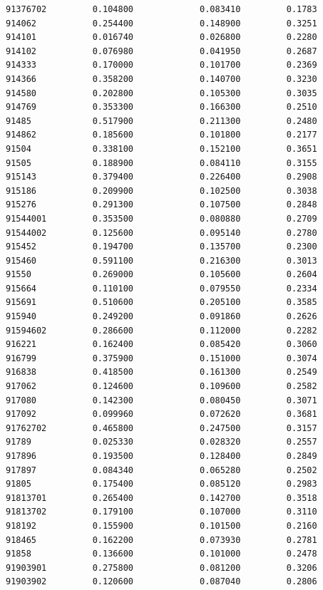 \documentclass[
  letterpaper,
  DIV=11,
  numbers=noendperiod]{scrartcl}
\begin{document}
\begin{verbatim}
91376702         0.104800             0.083410         0.1783
914062           0.254400             0.148900         0.3251
914101           0.016740             0.026800         0.2280
914102           0.076980             0.041950         0.2687
914333           0.170000             0.101700         0.2369
914366           0.358200             0.140700         0.3230
914580           0.202800             0.105300         0.3035
914769           0.353300             0.166300         0.2510
91485            0.517900             0.211300         0.2480
914862           0.185600             0.101800         0.2177
91504            0.338100             0.152100         0.3651
91505            0.188900             0.084110         0.3155
915143           0.379400             0.226400         0.2908
915186           0.209900             0.102500         0.3038
915276           0.291300             0.107500         0.2848
91544001         0.353500             0.080880         0.2709
91544002         0.125600             0.095140         0.2780
915452           0.194700             0.135700         0.2300
915460           0.591100             0.216300         0.3013
91550            0.269000             0.105600         0.2604
915664           0.110100             0.079550         0.2334
915691           0.510600             0.205100         0.3585
915940           0.249200             0.091860         0.2626
91594602         0.286600             0.112000         0.2282
916221           0.162400             0.085420         0.3060
916799           0.375900             0.151000         0.3074
916838           0.418500             0.161300         0.2549
917062           0.124600             0.109600         0.2582
917080           0.142300             0.080450         0.3071
917092           0.099960             0.072620         0.3681
91762702         0.465800             0.247500         0.3157
91789            0.025330             0.028320         0.2557
917896           0.193500             0.128400         0.2849
917897           0.084340             0.065280         0.2502
91805            0.175400             0.085120         0.2983
91813701         0.265400             0.142700         0.3518
91813702         0.179100             0.107000         0.3110
918192           0.155900             0.101500         0.2160
918465           0.162200             0.073930         0.2781
91858            0.136600             0.101000         0.2478
91903901         0.275800             0.081200         0.3206
91903902         0.120600             0.087040         0.2806

\end{verbatim}
\end{document}
